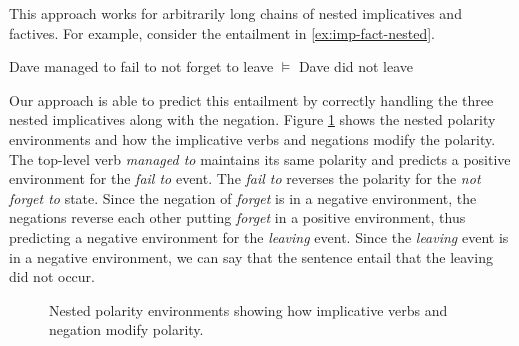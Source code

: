 This approach works for arbitrarily long chains of nested implicatives and
factives.
For example, consider the entailment in \eqref{ex:imp-fact-nested}.
\begin{covex}\label{ex:imp-fact-nested}
  Dave managed to fail to not forget to leave $\vDash$ Dave did not leave
\end{covex}
Our approach is able to predict this entailment by correctly handling the three
nested implicatives along with the negation. Figure \ref{fig:imp-fact-nested} 
shows the nested polarity environments and how the implicative verbs and negations 
modify the polarity.  The top-level verb {\it managed to} maintains its same 
polarity and predicts a positive environment for the {\it fail to} event.  The 
{\it fail to} reverses the polarity for the {\it not forget to} state.  Since
the negation of {\it forget} is in a negative environment, the negations reverse
each other putting {\it forget} in a positive environment, thus predicting a
negative environment for the {\it leaving} event.  Since the {\it leaving} event
is in a negative environment, we can say that the sentence entail that the 
leaving did not occur.
\begin{figure}
\caption{Nested polarity environments showing how implicative verbs and
negation modify polarity.}
\label{fig:imp-fact-nested}
\end{figure}



